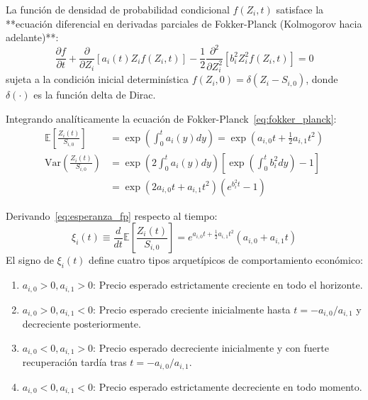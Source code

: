\documentclass[11pt,a4paper]{report}
\numberwithin{equation}{chapter}
\begin{document}
La función de densidad de probabilidad condicional $f(Z_i, t)$ satisface la **ecuación diferencial en derivadas parciales de Fokker-Planck (Kolmogorov hacia adelante)**:
\begin{equation}
    \frac{\partial f}{\partial t} + \frac{\partial}{\partial Z_i} \left[ a_i(t) Z_i f(Z_i, t) \right] - \frac{1}{2} \frac{\partial^2}{\partial Z_i^2} \left[ b_i^2 Z_i^2 f(Z_i, t) \right] = 0 \label{eq:fokker_planck}
\end{equation}
sujeta a la condición inicial determinística $f(Z_i, 0) = \delta(Z_i - S_{i,0})$, donde $\delta(\cdot)$ es la función delta de Dirac.

Integrando analíticamente la ecuación de Fokker-Planck~\eqref{eq:fokker_planck}:
\begin{align}
    \mathbb{E}\left[ \frac{Z_i(t)}{S_{i,0}} \right] &= \exp\left( \int_0^t a_i(y) dy \right) = \exp\left( a_{i,0} t + \frac{1}{2} a_{i,1} t^2 \right) \label{eq:esperanza_fp} \\
    \mathrm{Var}\left( \frac{Z_i(t)}{S_{i,0}} \right) &= \exp\left( 2 \int_0^t a_i(y) dy \right) \left[ \exp\left( \int_0^t b_i^2 dy \right) - 1 \right] \nonumber \\
    &= \exp\left( 2 a_{i,0} t + a_{i,1} t^2 \right) \left( e^{b_i^2 t} - 1 \right) \label{eq:varianza_fp}
\end{align}

Derivando~\eqref{eq:esperanza_fp} respecto al tiempo:
\begin{equation}
    \xi_i(t) \equiv \frac{d}{dt} \mathbb{E}\left[ \frac{Z_i(t)}{S_{i,0}} \right] = e^{a_{i,0} t + \frac{1}{2} a_{i,1} t^2} (a_{i,0} + a_{i,1} t)
\end{equation}
El signo de $\xi_i(t)$ define cuatro tipos arquetípicos de comportamiento económico:
\begin{enumerate}
    \item $a_{i,0} > 0, a_{i,1} > 0$: Precio esperado estrictamente creciente en todo el horizonte.
    \item $a_{i,0} > 0, a_{i,1} < 0$: Precio esperado creciente inicialmente hasta $t = -a_{i,0}/a_{i,1}$ y decreciente posteriormente.
    \item $a_{i,0} < 0, a_{i,1} > 0$: Precio esperado decreciente inicialmente y con fuerte recuperación tardía tras $t = -a_{i,0}/a_{i,1}$.
    \item $a_{i,0} < 0, a_{i,1} < 0$: Precio esperado estrictamente decreciente en todo momento.
\end{enumerate}
\end{document}
